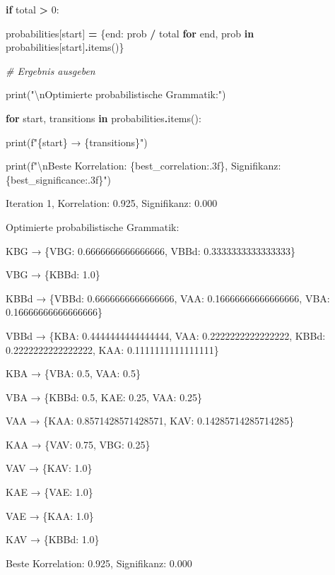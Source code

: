\documentclass[
]{article}
\begin{document}
\textbf{if} total \textbf{\textgreater{}} 0:

probabilities{[}start{]} \textbf{=} \{end: prob \textbf{/} total
\textbf{for} end, prob \textbf{in}
probabilities{[}start{]}\textbf{.}items()\}

\emph{\# Ergebnis ausgeben}

print("\textbackslash nOptimierte probabilistische Grammatik:")

\textbf{for} start, transitions \textbf{in}
probabilities\textbf{.}items():

print(f"\{start\} → \{transitions\}")

print(f"\textbackslash nBeste Korrelation: \{best\_correlation:.3f\},
Signifikanz: \{best\_significance:.3f\}")

Iteration 1, Korrelation: 0.925, Signifikanz: 0.000

Optimierte probabilistische Grammatik:

KBG → \{\textquotesingle VBG\textquotesingle: 0.6666666666666666,
\textquotesingle VBBd\textquotesingle: 0.3333333333333333\}

VBG → \{\textquotesingle KBBd\textquotesingle: 1.0\}

KBBd → \{\textquotesingle VBBd\textquotesingle: 0.6666666666666666,
\textquotesingle VAA\textquotesingle: 0.16666666666666666,
\textquotesingle VBA\textquotesingle: 0.16666666666666666\}

VBBd → \{\textquotesingle KBA\textquotesingle: 0.4444444444444444,
\textquotesingle VAA\textquotesingle: 0.2222222222222222,
\textquotesingle KBBd\textquotesingle: 0.2222222222222222,
\textquotesingle KAA\textquotesingle: 0.1111111111111111\}

KBA → \{\textquotesingle VBA\textquotesingle: 0.5,
\textquotesingle VAA\textquotesingle: 0.5\}

VBA → \{\textquotesingle KBBd\textquotesingle: 0.5,
\textquotesingle KAE\textquotesingle: 0.25,
\textquotesingle VAA\textquotesingle: 0.25\}

VAA → \{\textquotesingle KAA\textquotesingle: 0.8571428571428571,
\textquotesingle KAV\textquotesingle: 0.14285714285714285\}

KAA → \{\textquotesingle VAV\textquotesingle: 0.75,
\textquotesingle VBG\textquotesingle: 0.25\}

VAV → \{\textquotesingle KAV\textquotesingle: 1.0\}

KAE → \{\textquotesingle VAE\textquotesingle: 1.0\}

VAE → \{\textquotesingle KAA\textquotesingle: 1.0\}

KAV → \{\textquotesingle KBBd\textquotesingle: 1.0\}

Beste Korrelation: 0.925, Signifikanz: 0.000
\end{document}
